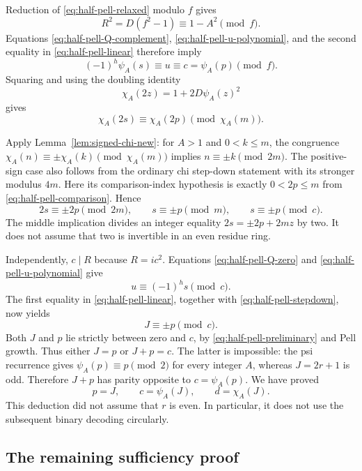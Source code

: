 Reduction of \eqref{eq:half-pell-relaxed} modulo $f$ gives
\[
 R^2=D(f^2-1)\equiv1-A^2\pmod f.
\]
Equations \eqref{eq:half-pell-Q-complement},
\eqref{eq:half-pell-u-polynomial}, and the second equality in
\eqref{eq:half-pell-linear} therefore imply
\[
 (-1)^h\psi_A(s)\equiv u\equiv c=\psi_A(p)\pmod f.
\]
Squaring and using the doubling identity
\[
 \chi_A(2z)=1+2D\psi_A(z)^2
\]
gives
\begin{equation}\label{eq:half-pell-chi-comparison}
 \chi_A(2s)\equiv\chi_A(2p)\pmod{\chi_A(m)}.
\end{equation}

Apply Lemma~\ref{lem:signed-chi-new}: for $A>1$ and
$0<k\le m$, the congruence
$\chi_A(n)\equiv\pm\chi_A(k)\pmod{\chi_A(m)}$ implies
$n\equiv\pm k\pmod{2m}$. The positive-sign case also follows
from the ordinary chi step-down statement with its stronger
modulus $4m$. Here its comparison-index hypothesis is exactly
$0<2p\le m$ from \eqref{eq:half-pell-comparison}. Hence
\begin{equation}\label{eq:half-pell-stepdown}
 2s\equiv\pm2p\pmod{2m},\qquad
 s\equiv\pm p\pmod m,\qquad s\equiv\pm p\pmod c.
\end{equation}
The middle implication divides an integer equality
$2s=\pm2p+2mz$ by two. It does not assume that two is invertible
in an even residue ring.

Independently, $c\mid R$ because $R=ic^2$. Equations
\eqref{eq:half-pell-Q-zero} and
\eqref{eq:half-pell-u-polynomial} give
\[
 u\equiv(-1)^h s\pmod c.
\]
The first equality in \eqref{eq:half-pell-linear}, together with
\eqref{eq:half-pell-stepdown}, now yields
\begin{equation}\label{eq:half-pell-main-congruence}
 J\equiv\pm p\pmod c.
\end{equation}
Both $J$ and $p$ lie strictly between zero and $c$, by
\eqref{eq:half-pell-preliminary} and Pell growth. Thus either
$J=p$ or $J+p=c$. The latter is impossible: the psi recurrence
gives $\psi_A(p)\equiv p\pmod2$ for every integer $A$, whereas
$J=2r+1$ is odd. Therefore $J+p$ has parity opposite to
$c=\psi_A(p)$. We have proved
\begin{equation}\label{eq:half-pell-main-index}
 p=J,\qquad c=\psi_A(J),\qquad d=\chi_A(J).
\end{equation}
This deduction did not assume that $r$ is even. In particular, it
does not use the subsequent binary decoding circularly.

\subsection{The remaining sufficiency proof}


